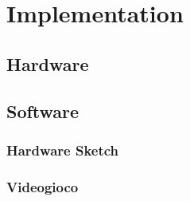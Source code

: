 \documentclass[12pt,a4paper]{book}
\author{Fabio Castello}
\begin{document}
	\chapter*{Implementation}
	\setcounter{chapter}{1}
	\section{Hardware}
		
	\newpage
	\section{Software}
		
		\subsection{Hardware Sketch}
			
		\subsection{Videogioco}
			
\end{document}
